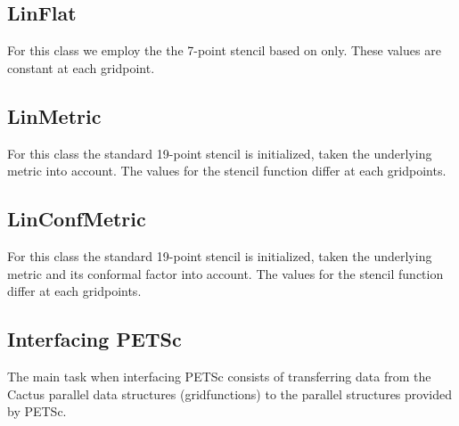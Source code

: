 \documentclass{article}
\begin{document}
\subsection{{\bf LinFlat}}
For this class we employ the the 7-point stencil based on only. 
These values are constant at each gridpoint.

\subsection{{\bf LinMetric}}
For this class the standard 19-point stencil is initialized, taken the 
underlying metric into account. The values for the stencil function
differ at each gridpoints.

\subsection{{\bf LinConfMetric}}
For this class the standard 19-point stencil is initialized, taken the 
underlying metric and its conformal factor into account. The values
for the stencil function differ at each gridpoints.

\subsection{Interfacing PETSc}
The main task when interfacing PETSc consists of transferring data
from the Cactus parallel data structures (gridfunctions) to the
parallel structures provided by PETSc.
\end{document}
